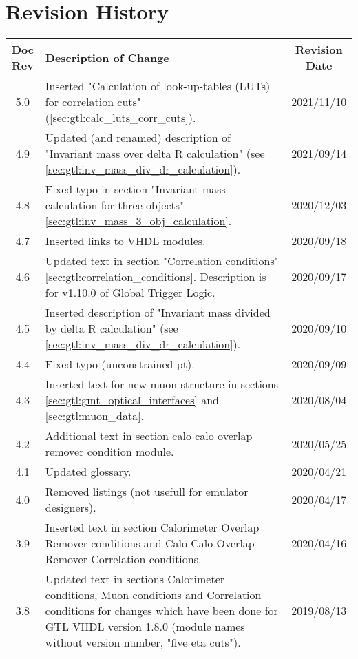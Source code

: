 \section*{Revision History}
\label{sec:revision_history}

\begin{longtable}{|c|p{}|c|}
\hline
Doc Rev & Description of Change & Revision Date\\
\hline
\hline
\endhead
5.0 & Inserted "Calculation of look-up-tables (LUTs) for correlation cuts" (\ref{sec:gtl:calc_luts_corr_cuts}). & 2021/11/10\\
4.9 & Updated (and renamed) description of "Invariant mass over delta R calculation" (see \ref{sec:gtl:inv_mass_div_dr_calculation}). & 2021/09/14\\
4.8 & Fixed typo in section "Invariant mass calculation for three objects" \ref{sec:gtl:inv_mass_3_obj_calculation}. & 2020/12/03\\
4.7 & Inserted links to VHDL modules. & 2020/09/18\\
4.6 & Updated text in section "Correlation conditions" \ref{sec:gtl:correlation_conditions}. Description is for v1.10.0 of Global Trigger Logic. & 2020/09/17\\
4.5 & Inserted description of "Invariant mass divided by delta R calculation" (see \ref{sec:gtl:inv_mass_div_dr_calculation}). & 2020/09/10\\
4.4 & Fixed typo (unconstrained pt). & 2020/09/09\\
4.3 & Inserted text for new muon structure in sections \ref{sec:gtl:gmt_optical_interfaces} and \ref{sec:gtl:muon_data}. & 2020/08/04\\
4.2 & Additional text in section calo calo overlap remover condition module. & 2020/05/25\\
4.1 & Updated glossary. & 2020/04/21\\
4.0 & Removed listings (not usefull for emulator designers). & 2020/04/17\\
3.9 & Inserted text in section Calorimeter Overlap Remover conditions and Calo Calo Overlap Remover Correlation conditions. & 2020/04/16\\
3.8 & Updated text in sections Calorimeter conditions, Muon conditions and Correlation conditions for changes which have been done for GTL VHDL version 1.8.0 (module names without version number, "five eta cuts"). & 2019/08/13\\

\end{longtable}
